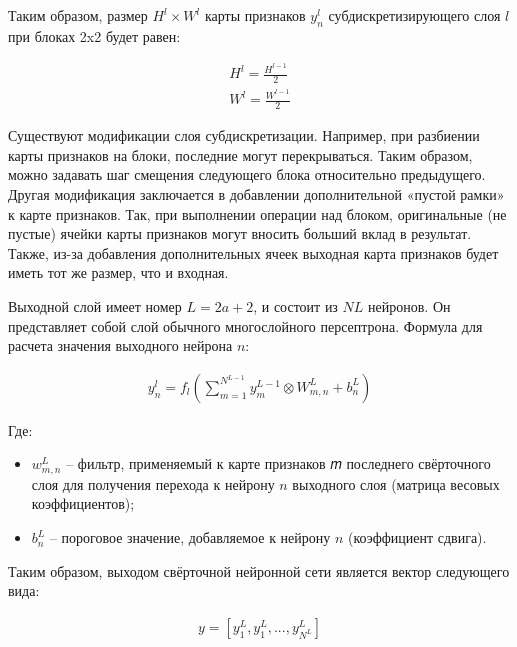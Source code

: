 Таким образом, размер $H^l \times W^l$ карты признаков $y_n^l$ субдискретизирующего слоя $l$ при блоках 2x2 будет равен:

\begin{equation}
  \begin{gathered}
    H^l = \frac {H^{l-1}} {2} \\
    W^l = \frac {W^{l-1}} {2}
  \end{gathered}
  \label{eq:speach_formula_10}
\end{equation}

Существуют модификации слоя субдискретизации. Например, при разбиении карты признаков на блоки, последние могут перекрываться. 
Таким образом, можно задавать шаг смещения следующего блока относительно предыдущего. 
Другая модификация заключается в добавлении дополнительной «пустой рамки» к карте признаков. 
Так, при выполнении операции над блоком, оригинальные (не пустые) ячейки карты признаков могут вносить больший вклад в результат. 
Также, из-за добавления дополнительных ячеек выходная карта признаков будет иметь тот же размер, что и входная.

Выходной слой имеет номер $L=2a+2$, и состоит из $NL$ нейронов. 
Он представляет собой слой обычного многослойного персептрона. Формула для расчета значения выходного нейрона $n$:

\begin{equation}
  \begin{gathered}
    y_n^l = f_l (\sum_{m=1}^{N^{L-1}} y_m^{L-1} \otimes W_{m,n}^L + b_n^L)
  \end{gathered}
  \label{eq:speach_formula_11}
\end{equation}

Где:
\begin{itemize}
  \item $w_{m,n}^L$ – фильтр, применяемый к карте признаков 𝑚 последнего свёрточного слоя для получения перехода к нейрону $n$ выходного слоя (матрица весовых коэффициентов);
  \item $b_n^L$ – пороговое значение, добавляемое к нейрону $n$ (коэффициент сдвига).
\end{itemize}

Таким образом, выходом свёрточной нейронной сети является вектор следующего вида:

\begin{equation}
  \begin{gathered}
    y = \left[ y_1^L,y_1^L, ...,  y_{N^L}^L\right]
  \end{gathered}
  \label{eq:speach_formula_12}
\end{equation}

